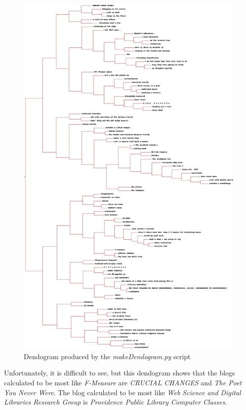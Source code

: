 \documentclass[letterpaper,11pt]{article}
\begin{document}
\clearpage
\begin{figure}[h]
\includegraphics[scale=0.26]{q2/blogclust.jpg}
\caption{Dendogram produced by the \emph{makeDendogram.py} script}
\label{fig:q2dendogram}
\end{figure}

\clearpage
Unfortunately, it is difficult to see, but this dendogram shows that the blogs calculated to be most like \emph{F-Measure} are \emph{CRUCIAL CHANGES} and \emph{The Poet You Never Were}.  The blog calculated to be most like \emph{Web Science and Digital Libraries Research Group} is \emph{Providence Public Library Computer Classes}.
\end{document}
